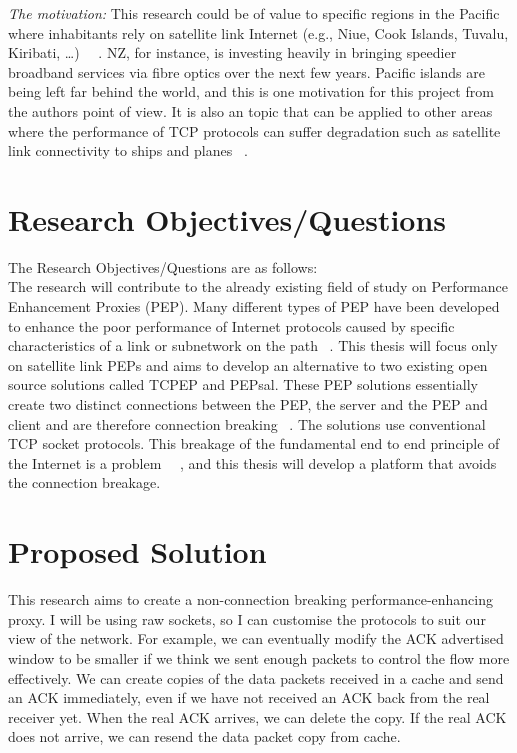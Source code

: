 \emph{The motivation:} This research could be of value to specific regions in the Pacific where inhabitants rely on satellite link Internet (e.g., Niue, Cook Islands, Tuvalu, Kiribati, …) ~\cite{3}~\cite{4}. NZ, for instance, is investing heavily in bringing speedier broadband services via fibre optics over the next few years. Pacific islands are being left far behind the world, and this is one motivation for this project from the authors point of view. It is also an topic that can be applied to other areas where the performance of TCP protocols can suffer degradation such as satellite link connectivity to ships and planes ~\cite{4}.

\section{Research Objectives/Questions}\label{Objective}
The Research Objectives/Questions are as follows:\\

The research will contribute to the already existing field of study on Performance Enhancement Proxies (PEP). Many different types of PEP have been developed to enhance the poor performance of Internet protocols caused by specific characteristics of a link or subnetwork on the path ~\cite{6}. This thesis will focus only on satellite link PEPs and aims to develop an alternative to two existing open source solutions called TCPEP and PEPsal. These PEP solutions essentially create two distinct connections between the PEP, the server and the PEP and client and are therefore connection breaking ~\cite{6}. The solutions use conventional TCP socket protocols. This breakage of the fundamental end to end principle of the Internet is a problem ~\cite{13}~\cite{14}, and this thesis will develop a platform that avoids the connection breakage. \\

\section{Proposed Solution}\label{Solution}
This research aims to create a non-connection breaking performance-enhancing proxy. I will be using raw sockets, so I can customise the protocols to suit our view of the network. For example, we can eventually modify the ACK advertised window to be smaller if we think we sent enough packets to control the flow more effectively. We can create copies of the data packets received in a cache and send an ACK immediately, even if we have not received an ACK back from the real receiver yet. When the real ACK arrives, we can delete the copy. If the real ACK does not arrive, we can resend the data packet copy from cache.\\

